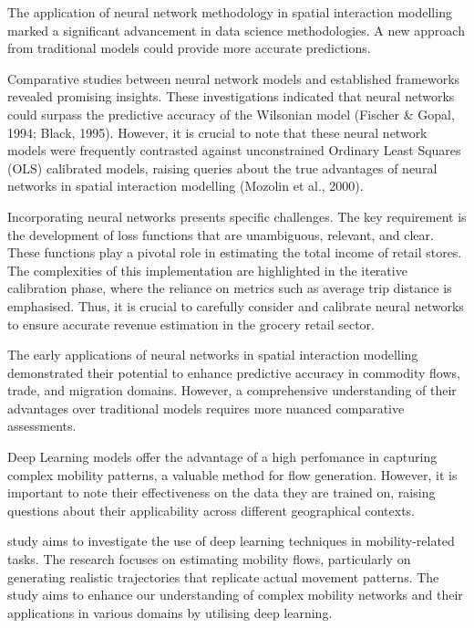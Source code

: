     The application of neural network methodology in spatial interaction modelling marked a significant advancement in data science methodologies. A new approach from traditional models could provide more accurate predictions. \citep{wilkinsonSpatialInteractionModels2023}
        
    Comparative studies between neural network models and established frameworks revealed promising insights. These investigations indicated that neural networks could surpass the predictive accuracy of the Wilsonian model (Fischer \& Gopal, 1994; Black, 1995). However, it is crucial to note that these neural network models were frequently contrasted against unconstrained Ordinary Least Squares (OLS) calibrated models, raising queries about the true advantages of neural networks in spatial interaction modelling (Mozolin et al., 2000). \citep{wilkinsonSpatialInteractionModels2023}
        
    Incorporating neural networks presents specific challenges. The key requirement is the development of loss functions that are unambiguous, relevant, and clear. These functions play a pivotal role in estimating the total income of retail stores. The complexities of this implementation are highlighted in the iterative calibration phase, where the reliance on metrics such as average trip distance is emphasised. Thus, it is crucial to carefully consider and calibrate neural networks to ensure accurate revenue estimation in the grocery retail sector. \citep{wilkinsonSpatialInteractionModels2023}
        
    The early applications of neural networks in spatial interaction modelling demonstrated their potential to enhance predictive accuracy in commodity flows, trade, and migration domains. However, a comprehensive understanding of their advantages over traditional models requires more nuanced comparative assessments\citep{wilkinsonSpatialInteractionModels2023}.

    Deep Learning models offer the advantage of a high perfomance in capturing complex mobility patterns, a valuable method for flow generation. However, it is important to note their effectiveness on the data they are trained on, raising questions about their applicability across different geographical contexts. \citep{wilkinsonSpatialInteractionModels2023}

    \cite{lucaSurveyDeepLearning2021} study aims to investigate the use of deep learning techniques in mobility-related tasks. The research focuses on estimating mobility flows, particularly on generating realistic trajectories that replicate actual movement patterns. The study aims to enhance our understanding of complex mobility networks and their applications in various domains by utilising deep learning.

